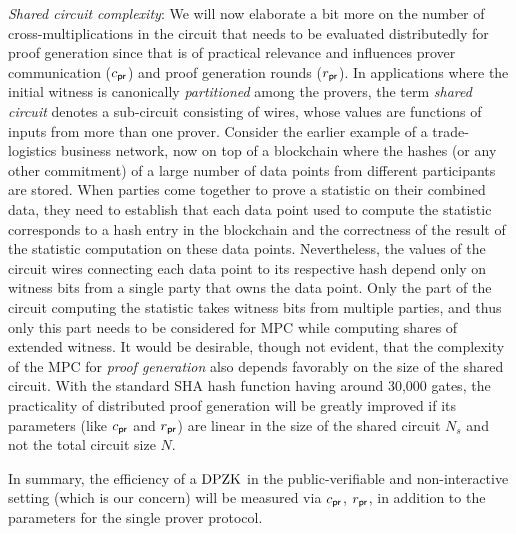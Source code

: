 \noindent\textit{Shared circuit complexity}:
We will now elaborate a bit more on the number of cross-multiplications in the circuit that needs to be evaluated distributedly for proof generation since
that is of practical relevance and influences prover communication ($c_\mathsf{pr}$)
and proof generation rounds ($r_\mathsf{pr}$). In applications where the initial witness is canonically \textit{partitioned} among the provers,  the term \textit{shared circuit} denotes a sub-circuit consisting of wires, whose values are functions of inputs from more than one prover. 
Consider the earlier example of a trade-logistics business network, now on top of a blockchain where the hashes (or any other commitment) of a large number of data points from different participants are stored. 
When parties come together to prove a statistic on their combined data, they
need to establish that each data point used to compute the statistic corresponds to a 
hash entry in the blockchain and the correctness of the result of the statistic computation on these data points. Nevertheless, the values of the circuit wires connecting each data point to its respective hash depend only on witness bits from a single party that owns the data point. Only the part of the circuit computing the statistic takes witness bits from multiple parties, and thus only this part needs to be considered for MPC while computing shares of extended witness. It would be desirable, though not evident, that the complexity of the MPC for {\em proof
	generation} also depends favorably on the size of the shared circuit. 
With the standard SHA hash function having around 30,000 gates, the practicality of distributed proof generation will be
greatly improved if its parameters (like $c_\mathsf{pr}$ and $r_\mathsf{pr}$) are 
linear in the size of the shared circuit $N_s$ and not the total circuit size $N$.

In summary, the efficiency of a $\text{DPZK}$ in the public-verifiable and
non-interactive setting (which is our concern) will be measured via $c_\mathsf{pr}$,
$r_\mathsf{pr}$, in addition to the parameters for the single prover protocol.

